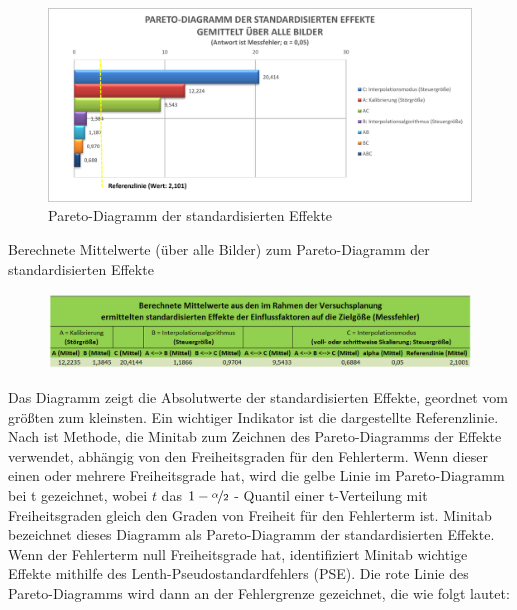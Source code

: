 \documentclass[
fontsize=10pt, 
listof = totoc,
parskip = half	
]{report}
\begin{document}
\begin{figure}[H]
	\centering
	\includegraphics[width=14cm, height=\textheight, keepaspectratio]{pics/DA_Pareto}
	\caption{Pareto-Diagramm der standardisierten Effekte}
	\label{fig:DAPareto}
\end{figure}

\begin{table}[H]
	\caption{Berechnete Mittelwerte (über alle Bilder) zum Pareto-Diagramm der standardisierten Effekte}
	\begin{figure}[H]
		\centering
		\includegraphics[width=\textwidth,height=\textheight,keepaspectratio]{pics/Tab_DA_Pareto}
		\label{tab:DAPareto}
	\end{figure}
\end{table}

\noindent Das Diagramm zeigt die Absolutwerte der standardisierten Effekte, geordnet vom größten zum kleinsten. Ein wichtiger Indikator ist die dargestellte Referenzlinie. Nach \cite{minitab_pareto} ist Methode, die Minitab zum Zeichnen des Pareto-Diagramms der Effekte verwendet, abhängig von den Freiheitsgraden für den Fehlerterm. Wenn dieser einen oder mehrere Freiheitsgrade hat, wird die gelbe Linie im Pareto-Diagramm bei t gezeichnet, wobei $t$ das $1-\nicefrac{\alpha}{2}$ - Quantil einer t-Verteilung mit Freiheitsgraden gleich den Graden von Freiheit für den Fehlerterm ist. Minitab bezeichnet dieses Diagramm als Pareto-Diagramm der standardisierten Effekte. Wenn der Fehlerterm null Freiheitsgrade hat, identifiziert Minitab wichtige Effekte mithilfe des Lenth-Pseudostandardfehlers (PSE). Die rote Linie des Pareto-Diagramms wird dann an der Fehlergrenze gezeichnet, die wie folgt lautet:
\end{document}
